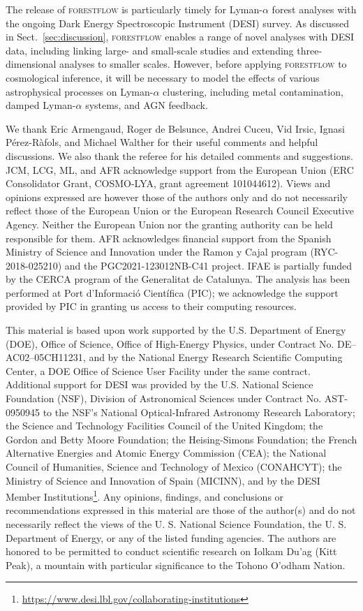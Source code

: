 \documentclass[longauth]{aa}
\newcommand{\lya}{Lyman-$\alpha$\xspace}
\newcommand{\lyaf}{Lyman-$\alpha$ forest\xspace}
\newcommand{\forestflow}{\textsc{forestflow}\xspace}
\begin{document}
The release of \forestflow is particularly timely for \lyaf analyses with the ongoing Dark Energy Spectroscopic Instrument (DESI) survey. As discussed in Sect.~\ref{sec:discussion}, \forestflow enables a range of novel analyses with DESI data, including linking large- and small-scale studies and extending three-dimensional analyses to smaller scales. However, before applying \forestflow to cosmological inference, it will be necessary to model the effects of various astrophysical processes on \lya clustering, including metal contamination, damped \lya systems, and AGN feedback.



\begin{acknowledgements}
We thank Eric Armengaud, Roger de Belsunce, Andrei Cuceu, Vid Irsic, Ignasi P\'erez-R\`afols, and Michael Walther for their useful comments and helpful discussions. We also thank the referee for his detailed comments and suggestions. JCM, LCG, ML, and AFR acknowledge support from the European Union (ERC Consolidator Grant, COSMO-LYA, grant agreement 101044612). Views and opinions expressed are however those of the authors only and do not necessarily reflect those of the European Union or the European Research Council Executive Agency. Neither the European Union nor the granting authority can be held responsible for them. AFR acknowledges financial support from the Spanish Ministry of Science and Innovation under the Ramon y Cajal program (RYC-2018-025210) and the PGC2021-123012NB-C41 project. IFAE is partially funded by the CERCA program of the Generalitat de Catalunya. The analysis has been performed at Port d’Informaci\'o Cient\'ifica (PIC); we acknowledge the support provided by PIC in granting us access to their computing resources.

This material is based upon work supported by the U.S. Department of Energy (DOE), Office of Science, Office of High-Energy Physics, under Contract No. DE–AC02–05CH11231, and by the National Energy Research Scientific Computing Center, a DOE Office of Science User Facility under the same contract. Additional support for DESI was provided by the U.S. National Science Foundation (NSF), Division of Astronomical Sciences under Contract No. AST-0950945 to the NSF’s National Optical-Infrared Astronomy Research Laboratory; the Science and Technology Facilities Council of the United Kingdom; the Gordon and Betty Moore Foundation; the Heising-Simons Foundation; the French Alternative Energies and Atomic Energy Commission (CEA); the National Council of Humanities, Science and Technology of Mexico (CONAHCYT); the Ministry of Science and Innovation of Spain (MICINN), and by the DESI Member Institutions\footnote{\url{https://www.desi.lbl.gov/collaborating-institutions}}. Any opinions, findings, and conclusions or recommendations expressed in this material are those of the author(s) and do not necessarily reflect the views of the U. S. National Science Foundation, the U. S. Department of Energy, or any of the listed funding agencies. The authors are honored to be permitted to conduct scientific research on Iolkam Du’ag (Kitt Peak), a mountain with particular significance to the Tohono O’odham Nation.
\end{acknowledgements}
\end{document}
